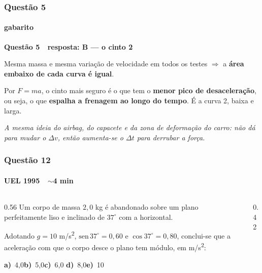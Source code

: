 \documentclass[aspectratio=169,12pt]{beamer}
\newcommand{\alternativascurtas}[5]{%
  \par\vspace{0.7em}%
  \noindent\textbf{a)}~#1\hfill\textbf{b)}~#2\hfill\textbf{c)}~#3%
  \hfill\textbf{d)}~#4\hfill\textbf{e)}~#5\par}
\newcommand{\resposta}[2]{%
  \par\vspace{0.2em}
  {\Large\bfseries\color{vinho}Quest\~ao #1 \,\textemdash\, resposta: #2}
  \par\vspace{0.6em}}
\begin{document}
\begin{frame}
\frametitle{Quest\~ao 5}
\framesubtitle{gabarito}
\resposta{5}{B --- o cinto 2}

Mesma massa e mesma varia\c{c}\~ao de velocidade em todos os testes
$\Rightarrow$ a \textbf{\'area embaixo de cada curva \'e igual}.

\vspace{0.3em}
Por $F = ma$, o cinto mais seguro \'e o que tem o \textbf{menor pico de
desacelera\c{c}\~ao}, ou seja, o que \textbf{espalha a frenagem ao
longo do tempo}. \'E a curva 2, baixa e larga.

\vspace{0.8em}
{\color{grafite}\itshape A mesma ideia do airbag, do capacete e da
zona de deforma\c{c}\~ao do carro: n\~ao d\'a para mudar o
$\Delta v$, ent\~ao aumenta-se o $\Delta t$ para derrubar a for\c{c}a.}
\end{frame}

\begin{frame}
\frametitle{Quest\~ao 12}
\framesubtitle{UEL 1995 \,\textperiodcentered\, $\sim$4 min}

\begin{columns}[T]
\begin{column}{0.56\textwidth}
Um corpo de massa $2{,}0$ kg \'e abandonado sobre um plano
perfeitamente liso e inclinado de $37^{\circ}$ com a
horizontal.

\vspace{0.4em}
Adotando $g = 10$ m/s\textsuperscript{2},
$\mathrm{sen}\,37^{\circ} = 0{,}60$ e $\cos 37^{\circ} = 0{,}80$,
conclui-se que a acelera\c{c}\~ao com que o corpo desce o plano tem
m\'odulo, em m/s\textsuperscript{2}:

\alternativascurtas{4,0}{5,0}{6,0}{8,0}{10}
\end{column}
\begin{column}{0.42\textwidth}
\centering
{}
\end{column}
\end{columns}
\end{frame}
\end{document}
